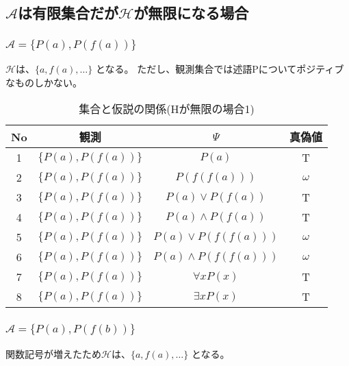 \documentclass[10pt, oneside]{jarticle}   	%
\theoremstyle{definition}
\newcommand{\undet}{\omega}
\newcommand{\eset}[1]{\{{#1}\}}
\begin{document}
\subsection{$\mathcal{A}$は有限集合だが$\mathcal{H}$が無限になる場合}
\subsubsection{$\mathcal{A}=\eset{P(a), P(f(a))}$}
$\mathcal{H}$は、$\eset{a, f(a), \dots}$ となる。
ただし、観測集合では述語Pについてポジティブなものしかない。

\begin{table}[htbp]
 \centering
 \begin{tabular}{|c|c|c|c|}\hline
   No & 観測 & $\Psi$ & 真偽値 \\ \hline
   1 & $\eset{P(a), P(f(a))}$ & $P(a)$ & T \\ \hline
   2 & $\eset{P(a), P(f(a))}$ & $P(f(f(a)))$ & $\undet $\\ \hline
   3 & $\eset{P(a), P(f(a))}$ & $P(a) \lor P(f(a))$ & T \\ \hline
   4 & $\eset{P(a), P(f(a))}$ & $P(a) \land P(f(a))$ & T\\ \hline
   
   5 & $\eset{P(a), P(f(a))}$ & $P(a) \lor P(f(f(a)))$ & $\undet$ \\ \hline
   6 & $\eset{P(a), P(f(a))}$ & $P(a) \land P(f(f(a)))$ & $\undet$ \\ \hline

   7 & $\eset{P(a), P(f(a))}$ & $\forall x P(x)$ & T \\ \hline
   8 & $\eset{P(a), P(f(a))}$ & $\exists x P(x)$ & T \\ \hline
 \end{tabular}
 \caption{集合と仮説の関係(Hが無限の場合1)}
 \label{tab:ex0201}
\end{table}

\subsubsection{$\mathcal{A}=\eset{P(a), P(f(b))}$}
関数記号が増えたため$\mathcal{H}$は、$\eset{a, f(a), \dots}$ となる。
\end{document}
